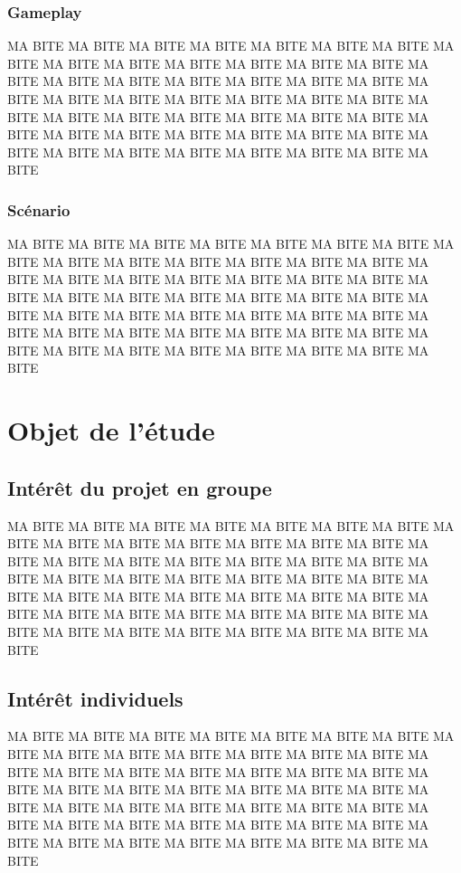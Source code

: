 \documentclass[12pt,a4paper]{article}
\begin{document}
\subsubsection{Gameplay}
MA BITE MA BITE MA BITE MA BITE MA BITE MA BITE MA BITE MA BITE MA BITE MA BITE 
MA BITE MA BITE MA BITE MA BITE MA BITE MA BITE MA BITE MA BITE MA BITE MA BITE 
MA BITE MA BITE MA BITE MA BITE MA BITE MA BITE MA BITE MA BITE MA BITE MA BITE 
MA BITE MA BITE MA BITE MA BITE MA BITE MA BITE MA BITE MA BITE MA BITE MA BITE 
MA BITE MA BITE MA BITE MA BITE MA BITE MA BITE MA BITE MA BITE MA BITE MA BITE 
\subsubsection{Scénario}
MA BITE MA BITE MA BITE MA BITE MA BITE MA BITE MA BITE MA BITE MA BITE MA BITE 
MA BITE MA BITE MA BITE MA BITE MA BITE MA BITE MA BITE MA BITE MA BITE MA BITE 
MA BITE MA BITE MA BITE MA BITE MA BITE MA BITE MA BITE MA BITE MA BITE MA BITE 
MA BITE MA BITE MA BITE MA BITE MA BITE MA BITE MA BITE MA BITE MA BITE MA BITE 
MA BITE MA BITE MA BITE MA BITE MA BITE MA BITE MA BITE MA BITE MA BITE MA BITE 

\newpage
\section{Objet de l'étude}
\subsection{Intérêt du projet en groupe}
MA BITE MA BITE MA BITE MA BITE MA BITE MA BITE MA BITE MA BITE MA BITE MA BITE 
MA BITE MA BITE MA BITE MA BITE MA BITE MA BITE MA BITE MA BITE MA BITE MA BITE 
MA BITE MA BITE MA BITE MA BITE MA BITE MA BITE MA BITE MA BITE MA BITE MA BITE 
MA BITE MA BITE MA BITE MA BITE MA BITE MA BITE MA BITE MA BITE MA BITE MA BITE 
MA BITE MA BITE MA BITE MA BITE MA BITE MA BITE MA BITE MA BITE MA BITE MA BITE 
\subsection{Intérêt individuels}
MA BITE MA BITE MA BITE MA BITE MA BITE MA BITE MA BITE MA BITE MA BITE MA BITE 
MA BITE MA BITE MA BITE MA BITE MA BITE MA BITE MA BITE MA BITE MA BITE MA BITE 
MA BITE MA BITE MA BITE MA BITE MA BITE MA BITE MA BITE MA BITE MA BITE MA BITE 
MA BITE MA BITE MA BITE MA BITE MA BITE MA BITE MA BITE MA BITE MA BITE MA BITE 
MA BITE MA BITE MA BITE MA BITE MA BITE MA BITE MA BITE MA BITE MA BITE MA BITE 
\end{document}
